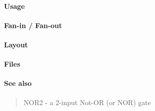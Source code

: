 \paragraph{Usage}

\paragraph{Fan-in / Fan-out}

\paragraph{Layout}

\paragraph{Files}

\paragraph{See also}
\begin{quote}
    NOR2 - a 2-input Not-OR (or NOR) gate
\end{quote}
